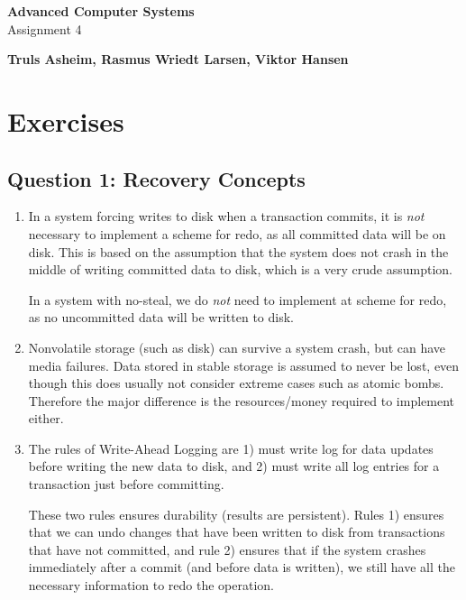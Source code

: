 \documentclass[11pt,a4paper,english]{article}
\begin{document}
\thispagestyle{empty} %
\hspace{6cm} \vspace{6cm}
\begin{center}
\textbf{\Huge {Advanced Computer Systems}}\\ \vspace{0.5cm}
\Large{Assignment 4}
\end{center}
\vspace{3cm}
\begin{center}
\Large{\textbf{Truls Asheim, Rasmus Wriedt Larsen, Viktor Hansen}}
\end{center}
\vspace{6.0cm}
\thispagestyle{empty}

\newpage

\section*{Exercises}

\subsection*{Question 1: Recovery Concepts}
\begin{enumerate}
\item In a system forcing writes to disk when a transaction commits, it is \emph{not}
  necessary to implement a scheme for redo, as all committed data will be on
  disk. This is based on the assumption that the system does not crash in the
  middle of writing committed data to disk, which is a very crude assumption.

  In a system with no-steal, we do \emph{not} need to implement at scheme for
  redo, as no uncommitted data will be written to disk.

\item Nonvolatile storage (such as disk) can survive a system crash, but can
  have media failures. Data stored in stable storage is assumed to never be
  lost, even though this does usually not consider extreme cases such as atomic
  bombs. Therefore the major difference is the resources/money required to
  implement either.

\item The rules of Write-Ahead Logging are 1) must write log for data updates
  before writing the new data to disk, and 2) must write all log entries for a
  transaction just before committing.

  These two rules ensures durability (results are persistent). Rules 1) ensures
  that we can undo changes that have been written to disk from transactions that
  have not committed, and rule 2) ensures that if the system crashes immediately
  after a commit (and before data is written), we still have all the necessary
  information to redo the operation.
\end{enumerate}
\end{document}
